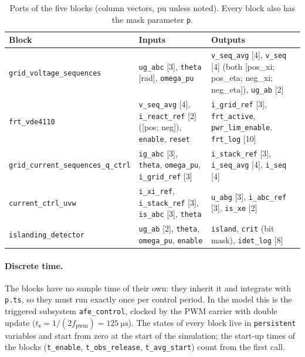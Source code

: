 \documentclass[11pt,a4paper]{scrartcl}
\newcommand{\ped}[1]{_{\mathrm{#1}}}
\newcommand{\code}[1]{\texttt{#1}}
\begin{document}
\begin{onehalfspace}
\begin{table}[H]
	\centering
	\footnotesize
	\caption{Ports of the five blocks (column vectors, pu unless noted). Every block also has the mask parameter \code{p}.}
	\label{tab:blocks}
	\begin{tabularx}{\textwidth}{@{} l X X @{}}
		\toprule
		\textbf{Block} & \textbf{Inputs} & \textbf{Outputs} \\
		\midrule
		\code{grid\_voltage\_sequences} & \code{ug\_abc} [3], \code{theta} [rad], \code{omega\_pu} & \code{v\_seq\_avg} [4], \code{v\_seq} [4] (both [pos\_xi; pos\_eta; neg\_xi; neg\_eta]), \code{ug\_ab} [2] \\
		\code{frt\_vde4110} & \code{v\_seq\_avg} [4], \code{i\_react\_ref} [2] ([pos; neg]), \code{enable}, \code{reset} & \code{i\_grid\_ref} [3], \code{frt\_active}, \code{pwr\_lim\_enable}, \code{frt\_log} [10] \\
		\code{grid\_current\_sequences\_q\_ctrl} & \code{ig\_abc} [3], \code{theta}, \code{omega\_pu}, \code{i\_grid\_ref} [3] & \code{i\_stack\_ref} [3], \code{i\_seq\_avg} [4], \code{i\_seq} [4] \\
		\code{current\_ctrl\_uvw} & \code{i\_xi\_ref}, \code{i\_stack\_ref} [3], \code{is\_abc} [3], \code{theta} & \code{u\_abg} [3], \code{i\_abc\_ref} [3], \code{is\_xe} [2] \\
		\code{islanding\_detector} & \code{ug\_ab} [2], \code{theta}, \code{omega\_pu}, \code{enable} & \code{island}, \code{crit} (bit mask), \code{idet\_log} [8] \\
		\bottomrule
	\end{tabularx}
\end{table}

\paragraph{Discrete time.} The blocks have no sample time of their own: they inherit it and integrate with \code{p.ts}, so they must run exactly once per control period. In the model this is the triggered subsystem \code{afe\_control}, clocked by the PWM carrier with double update ($t\ped{s} = 1/(2 f\ped{pwm}) = \SI{125}{\micro\second}$). The states of every block live in \code{persistent} variables and start from zero at the start of the simulation; the start-up times of the blocks (\code{t\_enable}, \code{t\_obs\_release}, \code{t\_avg\_start}) count from the first call.


\end{onehalfspace}
\end{document}

